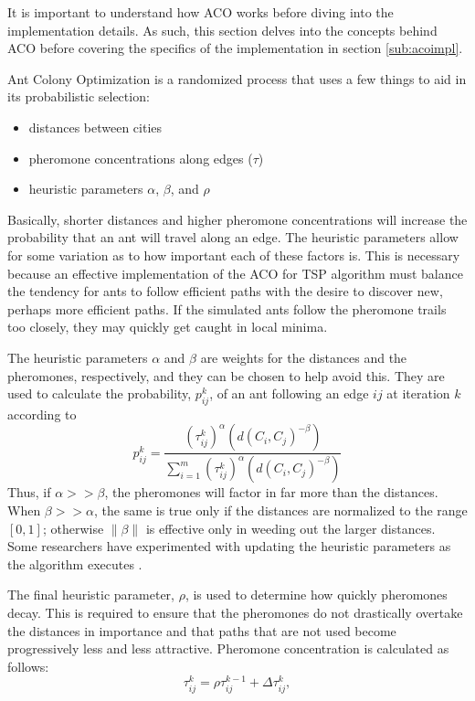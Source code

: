 \documentclass[twocolumn]{article}
\begin{document}
It is important to understand how ACO works before diving into 
the implementation details. As such, this section delves
into the concepts behind ACO before covering the
specifics of the implementation in section \ref{sub:acoimpl}. 

Ant Colony Optimization is a randomized process that uses a few things to aid
in its probabilistic selection:
\begin{itemize}
\item distances between cities
\item pheromone concentrations along edges ($\tau$)
\item heuristic parameters $\alpha$, $\beta$, and $\rho$
\end{itemize}
Basically, shorter distances and higher pheromone concentrations will
increase the probability that an ant will travel along an edge. The 
heuristic parameters allow for some variation as to how important 
each of these factors is. This is necessary because an effective 
implementation of the ACO for TSP algorithm must balance the tendency
for ants to follow efficient paths with the desire to discover new, 
perhaps more efficient paths. If the simulated ants follow the 
pheromone trails too closely, they may quickly get caught in local
minima. 

The heuristic parameters $\alpha$ and $\beta$ are weights for the distances and 
the pheromones, respectively, and they can be chosen to help avoid this. They 
are used to calculate the probability, $p^k_{ij}$, of an ant following an edge
$ij$ at iteration $k$ according to 
\begin{equation}
p_{ij}^k = \frac{(\tau^k_{ij})^\alpha(d(C_i,C_j)^{-\beta})}{\sum_{i=1}^m 
  (\tau^k_{ij})^\alpha(d(C_i,C_j)^{-\beta})} \label{eq:probs}
\end{equation}
Thus, if $\alpha >> \beta$, the pheromones will factor in far more than the
distances. When $\beta >> \alpha$, the same is true only if the distances are 
normalized to the range $[0,1]$; otherwise $\|\beta\|$ is effective only in 
weeding out the larger distances. Some researchers have experimented with 
updating the heuristic parameters as the algorithm executes \cite{ipcsit:aco}.

The final heuristic parameter, $\rho$, is used to 
determine how quickly pheromones decay. This is required to ensure that the pheromones do not
drastically overtake the distances in importance and that paths that are not used become 
progressively less and less attractive. Pheromone concentration is calculated as follows:
\begin{equation}
\tau^k_{ij} = \rho \tau^{k-1}_{ij} + \Delta \tau^k_{ij}, \label{eq:phers}
\end{equation}
\end{document}
